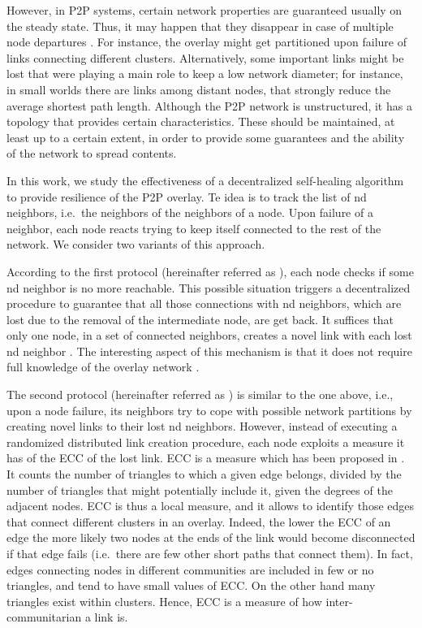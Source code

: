 \documentclass[10pt, conference, compsocconf]{IEEEtran}
\begin{document}
However, in P2P systems, certain network properties are guaranteed usually on the steady state. Thus, 
it may happen that they disappear in case of multiple node departures \cite{Leonard:2005}. For instance, the overlay might get partitioned upon failure of links connecting different clusters. 
Alternatively, some important links might be lost that were playing a main role to keep a low network diameter; for instance, in small worlds there are links among distant nodes, that strongly reduce the average shortest path length.
Although the P2P network is unstructured, it has a topology that provides certain characteristics. These should be maintained, at least up to a certain extent, in order to provide some guarantees and the ability of the network to spread contents.

In this work, we study the effectiveness of a decentralized self-healing algorithm to provide resilience of the P2P overlay. 
Te idea is to track the list of nd neighbors, i.e.~the neighbors of the neighbors of a node. Upon failure of a neighbor, each node reacts trying to keep itself connected to the rest of the network.
We consider two variants of this approach. 

According to the first protocol (hereinafter referred as ), 
each node  checks if some nd neighbor is no more reachable. This possible situation triggers a decentralized procedure to guarantee that all those connections with nd neighbors, which are lost due to the removal of the intermediate node, are get back.
It suffices that only one node, in a set of connected neighbors, creates a novel link with each lost nd neighbor \cite{simplex13}.
The interesting aspect of this mechanism is that it does not require full knowledge of the overlay network \cite{massoulie,VoulgarisGS05}. 

The second protocol (hereinafter referred as ) is similar to the one above, i.e., upon a node failure, its neighbors try to cope with possible network partitions by creating novel links to their lost nd neighbors. However, instead of executing a randomized distributed link creation procedure, each node exploits a measure it has of the \ac{ECC} of the lost link.
\ac{ECC} is a measure which has been proposed in \cite{radicchi2004}. It counts the number of triangles to which a given edge belongs, divided by the number of triangles that might potentially include it, given the degrees of the adjacent nodes.
ECC is thus a local measure, and it allows to identify those edges that connect different clusters in an overlay. 
Indeed, the lower the ECC of an edge the more likely two nodes at the ends of the link would become disconnected if that edge fails (i.e.~there are few other short paths that connect them).
In fact, edges connecting nodes in different communities are included in few or no triangles, and tend to have small values of ECC. On the other hand many triangles exist within clusters. Hence, ECC is a measure of how inter-communitarian a link is.
\end{document}
